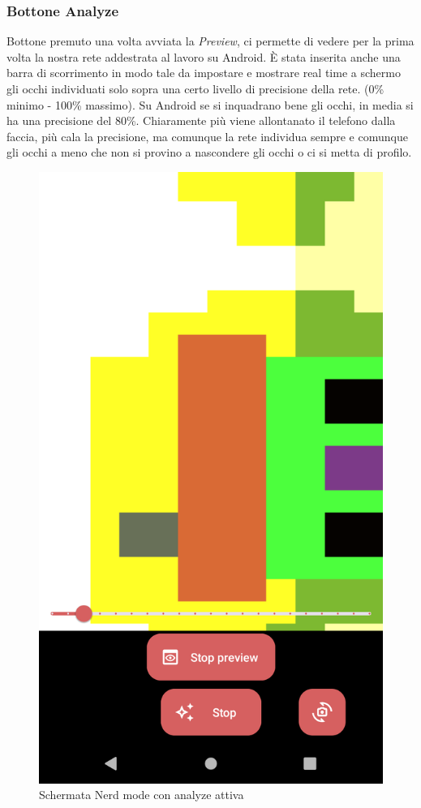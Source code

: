 \documentclass[11pt]{article}
\begin{document}
\newpage
\subsubsection{Bottone Analyze}
Bottone premuto una volta avviata la \textit{Preview}, ci permette di vedere per la prima volta la nostra rete addestrata al lavoro su Android.
È stata inserita anche una barra di scorrimento in modo tale da impostare e mostrare real time a schermo gli occhi individuati solo sopra una certo livello di precisione della rete. (0\% minimo - 100\% massimo). Su Android se si inquadrano bene gli occhi, in media si ha una precisione del 80\%. 
\newline
Chiaramente più viene allontanato il telefono dalla faccia, più cala la precisione, ma comunque la rete individua sempre e comunque gli occhi a meno che non si provino a nascondere gli occhi o ci si metta di profilo.

\begin{figure}[h]
\caption{Schermata Nerd mode con analyze attiva }
\centering
\includegraphics[scale=0.17]{img/analyze.png}
\end{figure}
\end{document}
